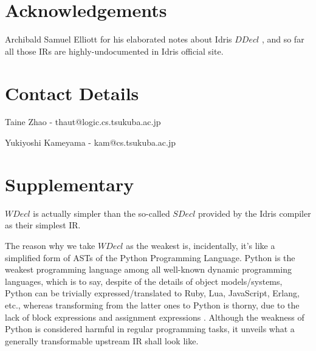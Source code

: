 \documentclass[a1,portrait]{a1poster}
\begin{document}
\begin{multicols}{2}
\section*{Acknowledgements}

Archibald Samuel Elliott for his elaborated notes about Idris $DDecl$ \cite {elliott2015concurrency}, and so far all those IRs are highly-undocumented in Idris official site.

\section*{Contact Details}

Taine Zhao - thaut@logic.cs.tsukuba.ac.jp

Yukiyoshi Kameyama - kam@cs.tsukuba.ac.jp

\section*{Supplementary}

$WDecl$ is actually simpler than the so-called $SDecl$ provided by the Idris compiler \cite {brady2013idris} as their simplest IR.

The reason why we take $WDecl$ as the weakest is, incidentally, it's like a simplified form
of ASTs of the Python Programming Language.
Python is the weakest programming language among all well-known dynamic programming languages,
which is to say, despite of the details of object models/systems, Python can be trivially
expressed/translated to Ruby, Lua, JavaScript, Erlang, etc., whereas transforming
from the latter ones to Python is thorny, due to the lack of block expressions and
assignment expressions \cite {pep572}. Although the weakness of Python is considered harmful in regular
programming tasks, it unveils what a generally transformable upstream IR shall look like.

\end{multicols}
\end{document}
